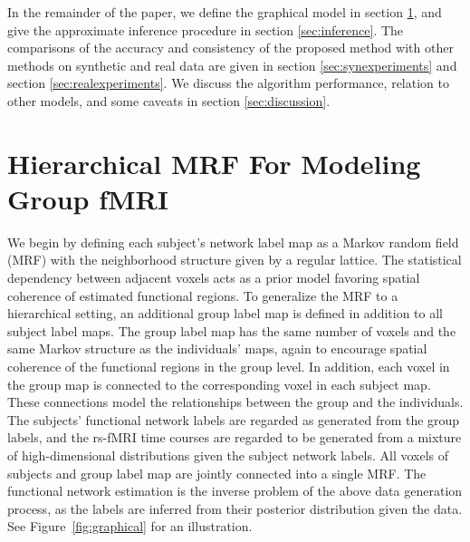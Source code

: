 \documentclass[review,authoryear]{elsarticle}
\begin{document}
In the remainder of the paper, we define the graphical model in section
\ref{sec:model}, and give the approximate inference procedure in section
\ref{sec:inference}. The comparisons of the accuracy and consistency of the
proposed method with other methods on synthetic and real data are given in
section \ref{sec:synexperiments} and section \ref{sec:realexperiments}. We
discuss the algorithm performance, relation to other models, and some caveats in
section \ref{sec:discussion}.

\section{Hierarchical MRF For Modeling Group fMRI}
\label{sec:model}
We begin by defining each subject's network label map as a Markov random field
(MRF) with the neighborhood structure given by a regular lattice. The
statistical dependency between adjacent voxels acts as a prior model favoring
spatial coherence of estimated functional regions. To generalize the MRF to a
hierarchical setting, an additional group label map is defined in addition to all
subject label maps. The group label map has the same number of voxels and the same
Markov structure as the individuals' maps, again to encourage spatial coherence of the
functional regions in the group level. In addition, each voxel in the group map
is connected to the corresponding voxel in each subject map. These connections model
the relationships between the group and the individuals. The subjects' functional network
labels are regarded as generated from the group labels, and
the rs-fMRI time courses are regarded to be generated from a mixture of
high-dimensional distributions given the subject network labels. All voxels of
subjects and group label map are jointly connected into a single MRF.  The functional
network estimation is the inverse problem of the above data generation process,
as the labels are inferred from their posterior distribution given the data. See
Figure~\ref{fig:graphical} for an illustration.
\end{document}
